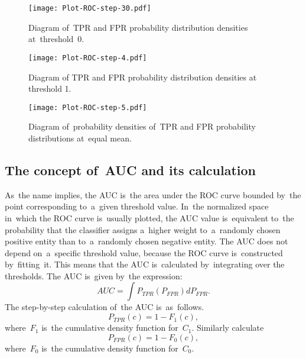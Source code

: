 \documentclass[]{scrreprt}
\begin{document}
%
\begin{figure}[htp]
	\centering
	\texttt{[image: Plot-ROC-step-30.pdf]}
	\caption{Diagram of~TPR and FPR probability distribution densities at~threshold~0.}
	\label{fig:plot-TPR-FPR-prob-density-3}
\end{figure}
%
\begin{figure}[htp]
	\centering
	\texttt{[image: Plot-ROC-step-4.pdf]}
	\caption{Diagram of TPR and FPR probability distribution densities at threshold 1.}
	\label{fig:plot-TPR-FPR-prob-density-4}
\end{figure}
%
\begin{figure}[htp]
	\centering
	\texttt{[image: Plot-ROC-step-5.pdf]}
	\caption{Diagram of~probability densities of~TPR and FPR probability distributions at~equal mean.}
	\label{fig:plot-TPR-FPR-prob-density-5}
\end{figure}
%
\subsection{The concept of~AUC and its calculation}
As~the name implies, the AUC is~the area under the ROC curve bounded by~the point corresponding to~a~given threshold value. In~the normalized space in~which the ROC curve is~usually plotted, the AUC value is~equivalent to~the probability that the classifier assigns a~higher weight to~a~randomly chosen positive entity than to~a~randomly chosen negative entity. The AUC does not depend on~a~specific threshold value, because the ROC curve is~constructed by~fitting~it. This means that the AUC is~calculated by~integrating over the thresholds. The AUC is~given by~the expression:
\begin{equation}\label{eq:AUC-computation-0}
AUC = \int P_{TPR}(P_{FPR}) d P_{FPR}.
\end{equation}
The step-by-step calculation of~the AUC is~as~follows.
\begin{equation}\label{eq:AUC-computation-1}
P_{TPR}(c) = 1 - F_{1}(c),
\end{equation}
where~$F_{1}$ is~the cumulative density function for~$C_{1}$. Similarly calculate
\begin{equation}\label{eq:AUC-computation-2}
P_{FPR}(c) = 1 - F_{0}(c),
\end{equation}
where~$F_{0}$ is~the cumulative density function for~$C_{0}$.
\end{document}
